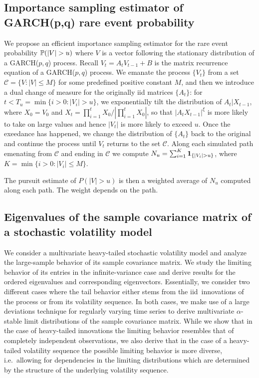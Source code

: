 \subsection{Importance sampling estimator of GARCH(p,q) rare event probability}
  We propose an efficient importance sampling estimator for the rare
  event probability $\P(|V| > u)$ where $V$ is a vector following the
  stationary distribution of a GARCH($p, q$) process. Recall
  $V_t = A_t V_{t-1} + B$ is the matrix recurrence equation of a
  GARCH($p, q$) process. We emanate the process $\{V_t\}$ from a set
  $\mathcal C = \{V: |V| \leq M\}$ for some predefined positive
  constant $M$, and then we introduce a dual change of measure for the
  originally iid matrices $\{A_t\}$: for
  $t < T_u = \min\{i > 0: |V_i| > u\}$, we exponentially tilt the
  distribution of $A_t | X_{t-1}$, where $X_0 = V_0$ and
  $X_t = \prod_{i=1}^t X_0/|\prod_{i=1}^t X_0|$, so that
  $|A_t X_{t-1}|^\xi$ is more likely to take on large values and hence
  $|V_t|$ is more likely to exceed $u$. Once the exeedance has
  happened, we change the
  distribution of $\{A_t\}$ back to the original and continue the
  process until $V_t$ returns to the set $\mathcal C$. Along each
  simulated path emenating from $\mathcal C$ and ending in
  $\mathcal C$ we compute $N_u = \sum_{i=1}^K \1{|V_i| > u}$, where
  $K = \min\{i > 0: |V_i| \leq M\}$.

  The pursuit estimate of $P(|V|>u)$ is then a weighted average of
  $N_u$ computed along each path. The weight depends on the path.

\subsection{Eigenvalues of the sample covariance matrix of a   
stochastic volatility model}
We consider a multivariate heavy-tailed stochastic volatility model
and analyze the large-sample behavior of its sample covariance
matrix. We study the limiting behavior of its entries in the
infinite-variance case and derive results for the ordered eigenvalues
and corresponding eigenvectors. Essentially, we consider two different
cases where the tail behavior either stems from the iid\ innovations
of the process or from its volatility sequence. In both cases, we make
use of a large deviations technique for regularly varying time series
to derive multivariate $\alpha$-stable limit distributions of the
sample covariance matrix. While we show that in the case of
heavy-tailed innovations the limiting behavior resembles that of
completely independent observations, we also derive that in the case
of a heavy-tailed volatility sequence the possible limiting behavior
is more diverse, i.e.\ allowing for dependencies in the limiting
distributions which are determined by the structure of the underlying
volatility sequence.

